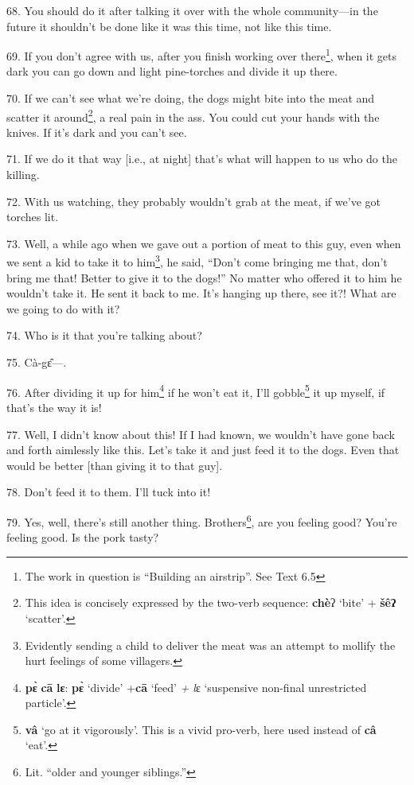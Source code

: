 68. You should do it after talking it over with the whole community---in the future
it shouldn't be done like it was this time, not like this time.

69. If you don't agree with us, after you finish working over there\footnote{The work in question is ``Building an airstrip''. See Text 6.5}, when
it gets dark you can go down and light pine-torches and divide it up there.

70. If we can't see what we're doing, the dogs might bite into the meat and scatter
it around\footnote{This idea is concisely expressed by the two-verb sequence: \textbf{chè}ʔ `bite' + \textbf{šêʔ} `scatter'.}, a real pain in the ass. You could cut your hands with the knives.
If it's dark and you can't see.

71. If we do it that way [i.e., at night] that's what will happen to us who do
the killing.

72. With us watching, they probably wouldn't grab at the meat, if we've got torches
lit.

73. Well, a while ago when we gave out a portion of meat to this guy, even when
we sent a kid to take it to him\footnote{Evidently sending a child to deliver the meat was an attempt to mollify the hurt feelings of some villagers.}, he said, ``Don't come bringing me that, don't
bring me that! Better to give it to the dogs!'' No matter who offered it to him
he wouldn't take it. He sent it back to me. It's hanging up there, see it?! What
are we going to do with it?

74. Who is it that you're talking about?

75. Cà-gɛ̂---.

76. After dividing it up for him\footnote{\textbf{pɛ̀} \textbf{cā} \textbf{lɛ}: \textbf{pɛ̀} `divide' +\textbf{cā} `feed'\textit{ + l}ɛ `suspensive non-final unrestricted particle'.} if he won't eat it, I'll gobble\footnote{\textbf{vâ} `go at it vigorously'. This is a vivid pro-verb, here used instead of \textbf{câ} `eat'.} it up
myself, if that's the way it is!

77. Well, I didn't know about this! If I had known, we wouldn't have gone back
and forth aimlessly like this. Let's take it and just feed it to the dogs. Even
that would be better [than giving it to that guy].

78. Don't feed it to them. I'll tuck into it!

79. Yes, well, there's still another thing. Brothers\footnote{Lit. ``older and younger siblings.''}, are you feeling good?
You're feeling good. Is the pork tasty?

